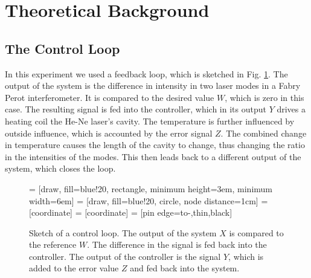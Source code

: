 \documentclass[a4paper,10pt]{article}
\begin{document}
\section{Theoretical Background}
\label{theory}
\subsection{The Control Loop}
In this experiment we used a feedback loop, which is sketched in Fig. \ref{fig_control_loop}. The output of the system is the difference in intensity in two laser modes in a Fabry Perot interferometer. It is compared to the desired value $W$, which is zero in this case. The resulting signal is fed into the controller, which in its output $Y$ drives a heating coil the He-Ne laser's cavity. The temperature is further influenced by outside influence, which is accounted by the error signal $Z$. The combined change in temperature causes the length of the cavity to change, thus changing the ratio in the intensities of the modes. This then leads back to a different output of the system, which closes the loop.
\begin{figure}[htp!]
    \centering
     = [draw, fill=blue!20, rectangle,
    minimum height=3em, minimum width=6em]
     = [draw, fill=blue!20, circle, node distance=1cm]
     = [coordinate]
     = [coordinate]
     = [pin edge={to-,thin,black}]

\caption{Sketch of a control loop. The output of the system $X$ is compared to the reference $W$. The difference in the signal is fed back into the controller. The output of the controller is the signal $Y$, which is added to the error value $Z$ and fed back into the system. }
\label{fig_control_loop}
\end{figure}
\end{document}

